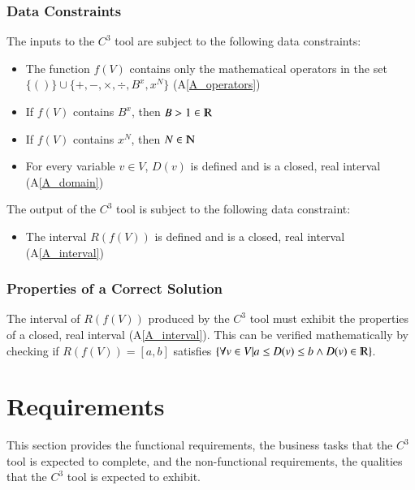 \documentclass[12pt]{article}
\newcommand{\aref}[1]{A\ref{#1}}
\newcommand{\prognameAbbrv}{$C^{3}$}
\begin{document}
\subsubsection{Data Constraints} \label{sec_DataConstraints}  
The inputs to the \prognameAbbrv{} tool are subject to the following data 
constraints:

\begin{itemize}
	\item The function $f(V)$ contains only the mathematical operators in 
	the set $\{()\} \cup \{+, -, \times, \div, B^x, x^N \}$ (\aref{A_operators})
	\item If $f(V)$ contains $B^x$, then $B > 1 \in \varmathbb{R}$
	\item If $f(V)$ contains $x^N$, then $N \in \varmathbb{N}$
	\item For every variable $v \in V$, $D(v)$ is defined and is a closed, real 
	interval (\aref{A_domain})
\end{itemize}

\noindent
The output of the \prognameAbbrv{} tool is subject to the following data 
constraint:

\begin{itemize}
	\item The interval $R(f(V))$ is defined and is a closed, real interval 
	(\aref{A_interval})
\end{itemize}

\subsubsection{Properties of a Correct Solution} 
\label{sec_CorrectSolution}

\noindent
The interval of $R(f(V))$ produced by the \prognameAbbrv{} tool must exhibit 
the properties of a closed, real interval (\aref{A_interval}). This can be 
verified mathematically by checking if $R(f(V)) = [a,b]$ satisfies $\{\forall v 
\in V | a \leq D(v) \leq b \wedge D(v) \in \varmathbb{R}\}$.


\section{Requirements}
\label{requirements}

This section provides the functional requirements, the business tasks that the
\prognameAbbrv{} tool is expected to complete, and the non-functional 
requirements, the qualities that the \prognameAbbrv{} tool is expected to 
exhibit.
\end{document}
